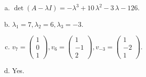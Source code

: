 \begin{questions}
\begin{solution}
\begin{enumerate}[(a)]
\item $\det(A-\lambda I)=-{\lambda}^{3} + 10 \, {\lambda}^{2} - 3 \, {\lambda} - 126$.
\item ${\lambda}_1=7, {\lambda}_2=6, {\lambda}_3=-3$.
\item $v_{7}=\left(\begin{array}{r}
1 \\
0 \\
1
\end{array}\right), v_{6}=\left(\begin{array}{r}
1 \\
-1 \\
2
\end{array}\right), v_{-3}=\left(\begin{array}{r}
1 \\
-2 \\
1
\end{array}\right)$.
\item Yes.
\end{enumerate}
\end{solution}

\end{questions}

\newpage


\begin{center}
\end{center}

